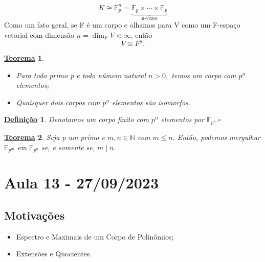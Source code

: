 \documentclass{article}
\newtheorem*{def*}{\underline{Defini\c c\~ao}}
\newtheorem*{theorem*}{\underline{Teorema}}
\begin{document}
  \[
    K\cong{\mathbb{F}_{p}^{n}} = \underbrace{\mathbb{F}_{p}\times \cdots\times \mathbb{F}_{p}}_{\text{n-vezes}}
  \]
  Como um fato geral, se F é um corpo e olhamos para V como um F-espaço vetorial com dimensão \(n = \dim_{F}V < \infty\), então 
  \[
    V\cong{F^{n}}.
  \]
 \begin{theorem*}
\begin{itemize}
    \item[1)] Para todo primo p e todo número natural \(n > 0,\) temos um corpo com \(p^{n}\) elementos;
    \item[2)] Quaisquer dois corpos com \(p^{n}\) elementos são isomorfos.
\end{itemize}
 \end{theorem*}
\begin{def*}
  Denotamos um corpo finito com \(p^{n}\) elementos por \(\mathbb{F}_{p^{n}}.\square\)
\end{def*}
\begin{theorem*}
  Seja p um primo e \(m, n\in \mathbb{N}\) com \(m\leq n.\) Então, podemos mergulhar \(\mathbb{F}_{p^{m}}\) em \(\mathbb{F}_{p^{n}}\) se, e somente se, \(m\mid n.\)
\end{theorem*}
\newpage

\section{Aula 13 - 27/09/2023}
\subsection{Motivações}
\begin{itemize}
  \item Espectro e Maximais de um Corpo de Polinômios;
  \item Extensões e Quocientes.
\end{itemize}
\end{document}
